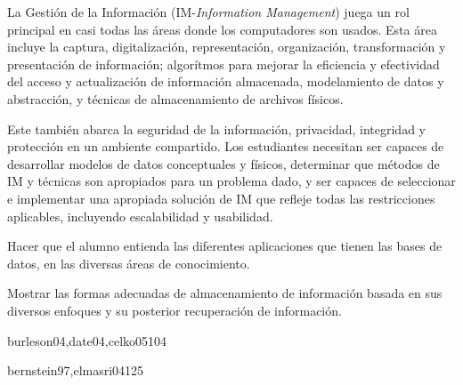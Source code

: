 \begin{syllabus}


\begin{justification}
La Gestión de la Información (IM-\textit{Information Management}) juega un rol principal en casi todas las áreas donde los computadores son usados. Esta área incluye la captura, digitalización, representación, organización, transformación y presentación de información; algorítmos para mejorar la eficiencia y efectividad del acceso y actualización de información almacenada, modelamiento de datos y abstracción, y técnicas de almacenamiento de archivos físicos.

Este también abarca la seguridad de la información, privacidad, integridad y protección en un ambiente compartido. Los estudiantes necesitan ser capaces de desarrollar modelos de datos conceptuales y físicos, determinar que métodos de IM y técnicas son apropiados para un problema dado, y ser capaces de seleccionar e implementar una apropiada solución de IM que refleje todas las restricciones aplicables, incluyendo escalabilidad y usabilidad.
\end{justification}

\begin{goals}
\item Hacer que el alumno entienda las diferentes aplicaciones que tienen las bases de datos, en las diversas áreas de conocimiento.
\item Mostrar las formas adecuadas de almacenamiento de información basada en sus diversos enfoques y su posterior recuperación de información.
\end{goals}

\begin{outcomes}
\end{outcomes}

\begin{unit}{\IMPhysicalDatabaseDesignDef}{burleson04,date04,celko05}{10}{4}
    \IMPhysicalDatabaseDesignAllTopics%
    \IMPhysicalDatabaseDesignAllObjectives%
\end{unit}

\begin{unit}{\IMTransactionProcessingDef}{bernstein97,elmasri04}{12}{5}
    \IMTransactionProcessingAllTopics
    \IMTransactionProcessingAllObjectives
\end{unit}


\end{syllabus}
